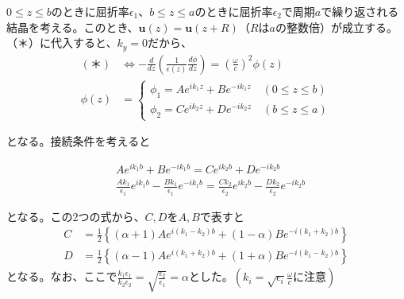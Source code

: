 \documentclass[a4paper,11pt,dvipdfmx]{jsarticle}
\begin{document}
\begin{enumerate}
  
  $0 \leq z \leq b$のときに屈折率$\epsilon_1$、$b \leq z \leq a$のときに屈折率$\epsilon_2$で周期$a$で繰り返される結晶を考える。このとき、$\mathbf{u} (z) = \mathbf{u} (z + R)$（$R$は$a$の整数倍）が成立する。（＊）に代入すると、$k_y = 0$だから、
    \begin{align*}
      (＊) &\Longleftrightarrow - \frac{d}{dz}\left( \frac{1}{\epsilon(z)} \frac{d\phi}{dz} \right) = \left( \frac{\omega}{c} \right)^2 \phi(z)
      \\
      \phi (z) &= 
      \begin{cases}
        \phi_1 = A e^{ik_1 z} + B e^{- i k_1 z} \quad \left( 0 \leq z \leq b \right) \\
        \phi_2 = C e^{ik_2 z} + D e^{- i k_2 z} \quad \left( b \leq z \leq a \right)
      \end{cases}
    \end{align*}

    となる。接続条件を考えると

    \begin{align*}
      & A e^{i k_1 b} + B e^{- i k_1 b} = C e^{i k_2 b} + D e^{- i k_2 b}
      \\
      & \frac{A k_1}{\epsilon_1} e^{i k_1 b} - \frac{B k_1}{\epsilon_1} e^{- i k_1 b} = \frac{C k_2}{\epsilon_2} e^{i k_2 b} - \frac{D k_2}{\epsilon_2}e^{- i k_2 b}
    \end{align*}

    となる。この2つの式から、$C, D$を$A, B$で表すと
    \begin{align*}
      C &= \frac{1}{2} \left\{ \left( \alpha + 1 \right) A e^{i \left( k_1 - k_2 \right) b } + \left( 1 - \alpha \right) B e^{- i \left( k_1 + k_2 \right) b } \right\} \\
      D &= \frac{1}{2} \left\{ \left( \alpha - 1 \right) A e^{i \left( k_1 + k_2 \right) b} + \left( 1 + \alpha \right) B e^{- i (k_1 - k_2)b} \right\}
    \end{align*}
    となる。なお、ここで$\displaystyle \frac{k_1 \epsilon_1}{k_2 \epsilon_2} = \sqrt{\frac{\epsilon_2}{\epsilon_1}} = \alpha$とした。$\left( \displaystyle k_i = \sqrt{\epsilon_i} \frac{\omega}{c}  に注意 \right) $


\end{enumerate}
\end{document}
